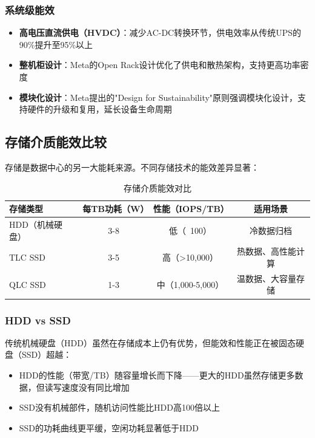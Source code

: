 \subsubsection{系统级能效}

\begin{itemize}
    \item \textbf{高电压直流供电（HVDC）}：减少AC-DC转换环节，供电效率从传统UPS的90\%提升至95\%以上
    \item \textbf{整机柜设计}：Meta的Open Rack设计优化了供电和散热架构，支持更高功率密度
    \item \textbf{模块化设计}：Meta提出的"Design for Sustainability"原则强调模块化设计，支持硬件的升级和复用，延长设备生命周期
\end{itemize}

\subsection{存储介质能效比较}

存储是数据中心的另一大能耗来源。不同存储技术的能效差异显著：

\begin{table}[htbp]
\centering
\caption{存储介质能效对比}
\begin{tabular}{lccc}
\toprule
\textbf{存储类型} & \textbf{每TB功耗（W）} & \textbf{性能（IOPS/TB）} & \textbf{适用场景} \\
\midrule
HDD（机械硬盘） & 3-8 & 低（~100） & 冷数据归档 \\
TLC SSD & 3-5 & 高（>10,000） & 热数据、高性能计算 \\
QLC SSD & 1-3 & 中（1,000-5,000） & 温数据、大容量存储 \\
\bottomrule
\end{tabular}
\label{tab:storage-efficiency}
\end{table}

\subsubsection{HDD vs SSD}

传统机械硬盘（HDD）虽然在存储成本上仍有优势，但能效和性能正在被固态硬盘（SSD）超越：
\begin{itemize}
    \item HDD的性能（带宽/TB）随容量增长而下降——更大的HDD虽然存储更多数据，但读写速度没有同比增加
    \item SSD没有机械部件，随机访问性能比HDD高100倍以上
    \item SSD的功耗曲线更平缓，空闲功耗显著低于HDD
\end{itemize}

